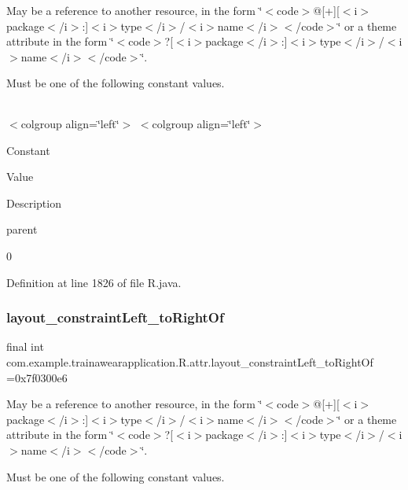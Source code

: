 May be a reference to another resource, in the form \char`\"{}$<$code$>$@\mbox{[}+\mbox{]}\mbox{[}$<$i$>$package$<$/i$>$\+:\mbox{]}$<$i$>$type$<$/i$>$/$<$i$>$name$<$/i$>$$<$/code$>$\char`\"{} or a theme attribute in the form \char`\"{}$<$code$>$?\mbox{[}$<$i$>$package$<$/i$>$\+:\mbox{]}$<$i$>$type$<$/i$>$/$<$i$>$name$<$/i$>$$<$/code$>$\char`\"{}. 

Must be one of the following constant values.

\tabulinesep=1mm
\begin{longtabu}spread 0pt [c]{*{0}{|X[-1]}|}
\hline
\end{longtabu}
$<$colgroup align=\char`\"{}left\char`\"{}$>$ $<$colgroup align=\char`\"{}left\char`\"{}$>$ 

Constant

Value

Description 

parent

0

Definition at line 1826 of file R.\+java.

\mbox{\label{classcom_1_1example_1_1trainawearapplication_1_1_r_1_1attr_aa1e57bb84da0b8a6fa479791d28162c5}} 
\subsubsection{\texorpdfstring{layout\_constraintLeft\_toRightOf}{layout\_constraintLeft\_toRightOf}}
{\footnotesize\ttfamily final int com.\+example.\+trainawearapplication.\+R.\+attr.\+layout\+\_\+constraint\+Left\+\_\+to\+Right\+Of =0x7f0300e6\hspace{0.3cm}{\ttfamily [static]}}

May be a reference to another resource, in the form \char`\"{}$<$code$>$@\mbox{[}+\mbox{]}\mbox{[}$<$i$>$package$<$/i$>$\+:\mbox{]}$<$i$>$type$<$/i$>$/$<$i$>$name$<$/i$>$$<$/code$>$\char`\"{} or a theme attribute in the form \char`\"{}$<$code$>$?\mbox{[}$<$i$>$package$<$/i$>$\+:\mbox{]}$<$i$>$type$<$/i$>$/$<$i$>$name$<$/i$>$$<$/code$>$\char`\"{}. 

Must be one of the following constant values.

